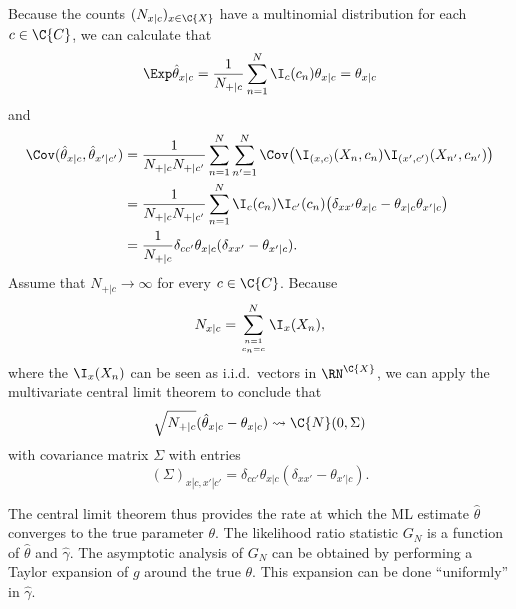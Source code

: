 Because the counts $(N_{x|c})_{x\in\C{X}}$ have a multinomial distribution for each $c\in\C{C}$, we can calculate that
$$\Exp \hat\theta_{x|c} = \frac{1}{N_{+|c}} \sum_{n=1}^N \I_c(c_n) \theta_{x|c} = \theta_{x|c}$$
and
\begin{equation*}\begin{split}
  \Cov(\hat \theta_{x|c}, \hat \theta_{x'|c'}) 
  & = \frac{1}{N_{+|c} N_{+|c'}} \sum_{n=1}^N \sum_{n'=1}^N \Cov\big( \I_{(x,c)}(X_n,c_n) \I_{(x',c')}(X_{n'},c_{n'}) \big) \\
  & = \frac{1}{N_{+|c} N_{+|c'}} \sum_{n=1}^N \I_c(c_n) \I_{c'}(c_{n}) \big( \delta_{xx'} \theta_{x|c} - \theta_{x|c} \theta_{x'|c} \big) \\
  & = \frac{1}{N_{+|c}} \delta_{cc'} \theta_{x|c} (\delta_{xx'} - \theta_{x'|c}).
\end{split}\end{equation*}
Assume that $N_{+|c} \to \infty$ for every $c \in \C{C}$.
Because
$$N_{x|c} = \sum_{n=1 \atop c_n=c}^N \I_{x}(X_n),$$
where the $\I_{x}(X_n)$ can be seen as i.i.d.\ vectors in $\RN^{\C{X}}$, we can apply the multivariate
central limit theorem to conclude that
  \begin{equation}\label{eq:multinomial_clt}
    \sqrt{N_{+|c}} (\hat\theta_{x|c} - \theta_{x|c}) \leadsto \C{N}(0,\Sigma)
  \end{equation}
with covariance matrix $\Sigma$ with entries
  \begin{equation}\label{eq:multinomial_cov}
    (\Sigma)_{x|c,x'|c'} = \delta_{cc'} \theta_{x|c} (\delta_{xx'} - \theta_{x'|c}).
  \end{equation}

The central limit theorem thus provides the rate at which the ML estimate $\hat \theta$ converges to the true parameter $\theta$.
The likelihood ratio statistic $G_N$ is a function of $\hat \theta$ and $\hat\gamma$. 
The asymptotic analysis of $G_N$ can be obtained by performing a Taylor expansion of $g$ around the true $\theta$. 
This expansion can be done ``uniformly'' in $\hat\gamma$.

